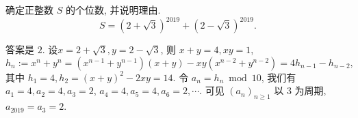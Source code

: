 \begin{prob}
\label{prob:prob-11}
确定正整数 $S$ 的个位数, 并说明理由.
\[
S = (2 + \sqrt{3})^{2019} + (2 - \sqrt{3})^{2019}.
\]
\end{prob}

\begin{soln}
答案是 $\boxed{2.}$ 设$x = 2 + \sqrt{3}, y = 2 - \sqrt{3}$,
则 $x + y = 4, xy = 1$,
\[
h_n := x^n + y^n = (x^{n-1} + y^{n-1})(x+y) - xy(x^{n-2} + y^{n-2})
     = 4h_{n-1} - h_{n-2},
\]
其中 $h_1 = 4, h_2 = (x + y)^2 - 2xy = 14$.
令 $a_n = h_n \bmod 10$, 我们有 $a_1 = 4, a_2 = 4, a_3 = 2$,
$a_4 = 4, a_5 = 4, a_6 = 2, \cdots$.
可见 $(a_n)_{n\ge 1}$ 以 $3$ 为周期, $a_{2019} = a_{3} = 2$.
\end{soln}
